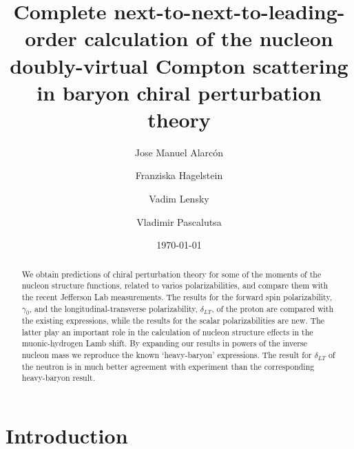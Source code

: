 \documentclass[twocolumn,prc,showpacs,nofootinbib,preprintnumbers,amsmath,amssymb,superscriptaddress]{revtex4-1}
\begin{document}
\title {Complete next-to-next-to-leading-order calculation of
the nucleon doubly-virtual Compton scattering  in baryon chiral perturbation theory}
\author{Jose Manuel Alarc\'on}
\author{Franziska Hagelstein}
\author{Vadim Lensky}
\author{Vladimir Pascalutsa}

\begin{abstract}
We obtain predictions of chiral perturbation theory for some of the moments of the nucleon structure functions, related to varios polarizabilities, and compare them with the recent Jefferson Lab measurements. 
 The results for the
forward spin polarizability, $\gamma_0$, and the longitudinal-transverse polarizability, $\delta_{LT}$,
of the proton are compared with the existing expressions, while the results
for the scalar polarizabilities are new. The latter play an
important role in the calculation of nucleon structure 
effects in the muonic-hydrogen Lamb shift. 
By expanding our results in powers of the inverse nucleon  mass
we reproduce the known `heavy-baryon' expressions. 
The result for $\delta_{LT}$ of the neutron
is in much better agreement with experiment than 
the corresponding heavy-baryon result.
\end{abstract}
\date{\today}
\maketitle

\tableofcontents

\section{Introduction}
\end{document}
